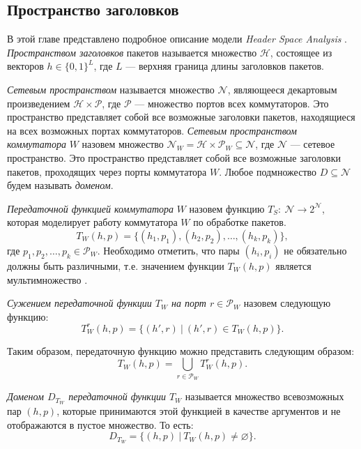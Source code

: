 \documentclass[../thesis.tex]{subfiles}
\begin{document}
\subsection{Пространство заголовков}

В этой главе представлено подробное описание модели \textit{Header Space Analysis} \cite{kazemian2012header}.
\\

\textit{Пространством заголовков} пакетов называется множество $\mathcal{H}$, состоящее из векторов $h\in \{0,1\}^L$, где $L$ --- верхняя граница длины заголовков пакетов.

\textit{Сетевым пространством} называется множество $\mathcal{N}$, являющееся декартовым произведением $\mathcal{H} \times \mathcal{P}$, где $\mathcal{P}$ --- множество портов всех коммутаторов.
Это пространство представляет собой все возможные заголовки пакетов, находящиеся на всех возможных портах коммутаторов.
\textit{Сетевым пространством коммутатора} $W$ назовем множество $\mathcal{N}_W = \mathcal{H} \times \mathcal{P}_W \subseteq \mathcal{N}$, где $\mathcal{N}$ --- сетевое пространство.
Это пространство представляет собой все возможные заголовки пакетов, проходящих через порты коммутатора $W$.
Любое подмножество $D\subseteq \mathcal{N}$ будем называть \textit{доменом}.

\textit{Передаточной функцией коммутатора} $W$ назовем функцию $T_S:\ \mathcal{N} \rightarrow 2^{\mathcal{N}}$, которая моделирует работу коммутатора $W$ по обработке пакетов.
\begin{equation}
T_W(h,p) = \big\{ (h_1,p_1), (h_2,p_2), \dots, (h_k,p_k) \big\},
\end{equation}
где $p_1,p_2,\dots,p_k\in \mathcal{P}_W$.
Необходимо отметить, что пары $(h_i,p_i)$ не обязательно должны быть различными, т.е. значением функции $T_W(h,p)$ является мультимножество \cite{jech2013set}.

\textit{Сужением передаточной функции $T_W$ на порт $r\in \mathcal{P}_W$} назовем следующую функцию:
\begin{equation}
T^r_W(h,p) = \big\{ (h',r)\ |\ (h',r)\in T_W(h,p) \big\}.
\end{equation}

Таким образом, передаточную функцию можно представить следующим образом:
\begin{equation}
  T_W(h,p) = \bigcup_{r\in \mathcal{P}_W} {T^r_W(h,p)}.
\end{equation}

\textit{Доменом $D_{T_W}$ передаточной функции $T_W$} называется множество всевозможных пар $(h,p)$, которые принимаются этой функцией в качестве аргументов и не отображаются в пустое множество.
То есть:
\begin{equation}
D_{T_W} = \big\{ (h,p)\ |\ T_W(h,p)\neq \varnothing \big\}.
\end{equation}
\end{document}
